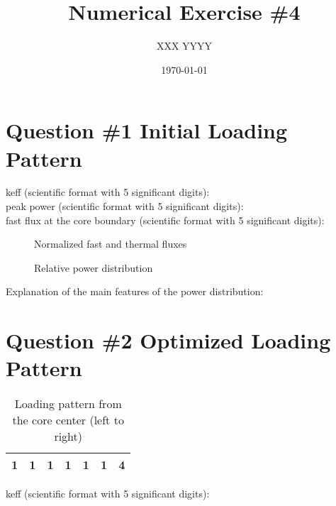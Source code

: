 \documentclass[11pt,a4paper]{article}
\begin{document}
\title{Numerical Exercise \#4}
\author{XXX YYYY\\  %
}
\date{\today}
\maketitle



\newpage
\section{Question \#1 Initial Loading Pattern}

keff (scientific format with 5 significant digits): \\

peak power (scientific format with 5 significant digits): \\

fast flux at the core boundary (scientific format with 5 significant digits): \\

\begin{figure}[h]
	\centering
	\caption{Normalized fast and thermal fluxes}
\end{figure}

\begin{figure}[h]
	\centering
	\caption{Relative power distribution}
\end{figure}

Explanation of the main features of the power distribution:\\


\section{Question \#2 Optimized Loading Pattern}

\begin{table}[H]
	\centering
	\begin{tabular}{|c|c|c|c|c|c|c|}
		\hline
		1& 1& 1& 1& 1& 1& 4\\
		\hline
	\end{tabular}
	\caption{Loading pattern from the core center (left to right)}
\end{table}

keff (scientific format with 5 significant digits): \\
\end{document}
